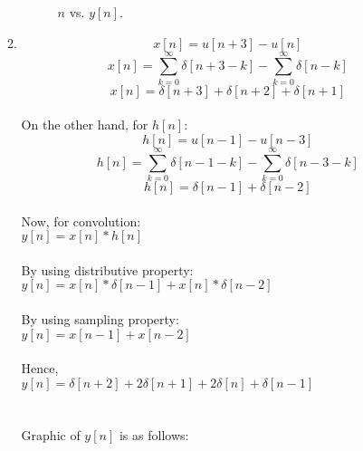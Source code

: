 \documentclass[10pt,a4paper, margin=1in]{article}
\begin{document}
\begin{enumerate}
\begin{enumerate}
    \begin{figure} [h!]
    \centering
    \caption{$n$ vs. $y[n]$.}
    \label{fig:q3_a}
\end{figure} 
    \item %
    
    \[x[n] = u[n+3] - u[n]\]
    \[x[n] = \sum_{k=0}^{\infty} \delta[n+3-k] - \sum_{k=0}^{\infty} \delta[n-k] \]
    \[x[n] =\delta[n+3] + \delta[n+2] + \delta[n+1] \] \\
    On the other hand, for $h[n]$: \\
    \[h[n] = u[n-1] - u[n-3]\]
    \[h[n] = \sum_{k=0}^{\infty} \delta[n-1-k] - \sum_{k=0}^{\infty} \delta[n-3-k] \]
    \[h[n] =\delta[n-1] + \delta[n-2] \] \\
    Now, for convolution: \\
    $y[n] = x[n] * h[n]$ \\
    \\
    By using distributive property: \\
    $y[n] = x[n] * \delta[n-1] + x[n] * \delta[n-2]$ \\
    \\
    By using sampling property: \\
    $y[n] = x[n-1] + x[n-2]$ \\
    \\
    Hence, \\
    $y[n] = \delta[n+2] +2\delta[n+1] + 2\delta[n] +\delta[n-1] $ \\
    \\
    \\
    Graphic of $y[n]$ is as follows: \\
    

\end{enumerate}
\end{enumerate}
\end{document}
